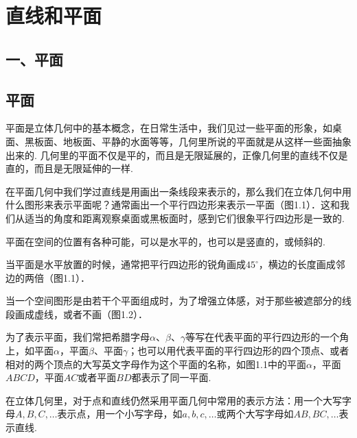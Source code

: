 \chapter{直线和平面}
\section*{一、平面}
\section{平面}
平面是立体几何中的基本概念，在日常生活中，我们见过一些平面的形象，如桌面、黑板面、地板面、平静的水面等等，几何里所说的平面就是从这样一些面抽象出来的. 几何里的平面不仅是平的，而且是无限延展的，正像几何里的直线不仅是直的，而且是无限延伸的一样.


\noindent
\begin{minipage}{.53\textwidth}
\CTEXindent
在平面几何中我们学过直线是用画出一条线段来表示的，那么我们在立体几何中用什么图形来表示平面呢？通常画出一个平行四边形来表示一平面（图1.1）．这和我们从适当的角度和距离观察桌面或黑板面时，感到它们很象平行四边形是一致的.
\end{minipage}
\hfill
\begin{minipage}{.45\textwidth}
\centering
{}
\end{minipage}

平面在空间的位置有各种可能，可以是水平的，也可以是竖直的，或倾斜的.

当平面是水平放置的时候，通常把平行四边形的锐角画成$45^{\circ}$，横边的长度画成邻边的两倍（图1.1）．

当一个空间图形是由若干个平面组成时，为了增强立体感，对于那些被遮部分的线段画成虚线，或者不画（图1.2）．

为了表示平面，我们常把希腊字母$\alpha$、$\beta$、$\gamma$等写在代表平面的平行四边形的一个角上，如平面$\alpha$，平面$\beta$、平面$\gamma$；也可以用代表平面的平行四边形的四个顶点、或者相对的两个顶点的大写英文字母作为这个平面的名称，如图1.1中的平面$\alpha$，平面$ABCD$，平面$AC$或者平面$BD$都表示了同一平面.

在立体几何里，对于点和直线仍然采用平面几何中常用的表示方法：用一个大写字母$A,B,C,\ldots$表示点，用一个小写字母，如$a,b,c,\ldots$或两个大写字母如$AB,BC,\ldots$表示直线.

